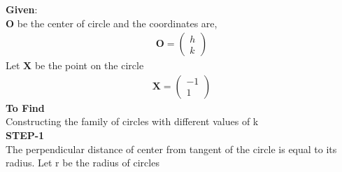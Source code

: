 \documentclass[10pt,a4paper]{report}
\newcommand{\myvec}[1]{\ensuremath{\begin{pmatrix}#1\end{pmatrix}}}
\let\vec\mathbf
\let\vec\mathbf
\begin{document}
\begin{multicols}{2}
\raggedright \textbf{Given}:\vspace{2mm}\\
$\vec{O}$ be the center of circle and the coordinates are,\vspace{1mm}
\begin{align}
\vec{O}=\myvec{
h\\
k
}
\end{align}
 \vspace{2mm}
Let $\vec{X}$ be the point on the circle \\\vspace{1mm}
\begin{align}
    \vec{X} = \myvec{
    -1\\
    1
    }
\end{align}
\textbf{To Find }\vspace{2mm}\\
Constructing the family of circles with different values of k \vspace{2mm}  \\ 
\textbf{STEP-1}\vspace{2mm}\\
The perpendicular distance of center from tangent of the circle is equal to its radius.
Let r be the radius of circles   \\ \vspace{1mm}


\end{multicols}
\end{document}
